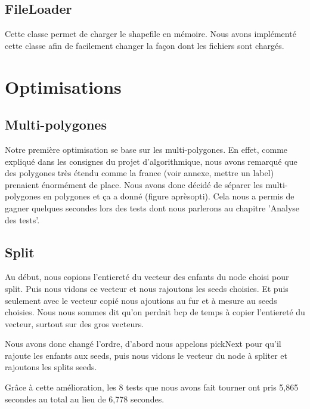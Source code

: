 \documentclass[utf8]{article}
\begin{document}
\begin{large}
  \subsection{FileLoader}
  \par
  \indent
  Cette classe permet de charger le shapefile en mémoire. Nous avons implémenté
  cette classe afin de facilement changer la façon dont les fichiers sont chargés.


  \section{Optimisations}
  \subsection{Multi-polygones}
  \par
  \indent
  Notre première optimisation se base sur les multi-polygones. En effet, comme
  expliqué dans les consignes du projet d'algorithmique, nous avons remarqué que
  des polygones très étendu comme la france (voir annexe, mettre un label)
  prenaient énormément de place. Nous avons donc décidé de séparer les
  multi-polygones en polygones et ça a donné (figure aprèsopti). Cela nous a
  permis de gagner quelques secondes lors des tests dont nous parlerons au
  chapitre 'Analyse des tests'.

  \subsection{Split}
  \par
  \indent
  Au début, nous copions l'entiereté du vecteur des enfants du node choisi pour
  split. Puis nous vidons ce vecteur et nous rajoutons les seeds choisies. Et puis
  seulement avec le vecteur copié nous ajoutions au fur et à mesure au seeds
  choisies. Nous nous sommes dit qu'on perdait bcp de temps à copier l'entiereté
  du vecteur, surtout sur des gros vecteurs.

  Nous avons donc changé l'ordre, d'abord nous appelons pickNext pour qu'il
  rajoute les enfants aux seeds, puis nous vidons le vecteur du node à spliter et
  rajoutons les splits seeds.

  Grâce à cette amélioration, les 8 tests que nous avons fait tourner ont pris
  5,865 secondes au total au lieu de 6,778 secondes.
  \par

\end{large}
\end{document}
